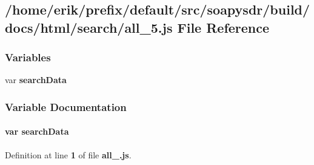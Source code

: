 \subsection{/home/erik/prefix/default/src/soapysdr/build/docs/html/search/all\+\_\+5.js File Reference}
\label{all__5_8js}
\subsubsection*{Variables}
\begin{DoxyCompactItemize}
\item 
var {\bf search\+Data}
\end{DoxyCompactItemize}


\subsubsection{Variable Documentation}
\paragraph[{search\+Data}]{\setlength{\rightskip}{0pt plus 5cm}var search\+Data}\label{all__5_8js_ad01a7523f103d6242ef9b0451861231e}


Definition at line {\bf 1} of file {\bf all\+\_.\+js}.


